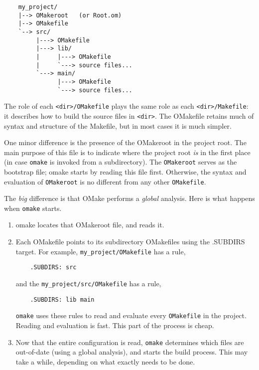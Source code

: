 \begin{verbatim}
    my_project/
    |--> OMakeroot   (or Root.om)
    |--> OMakefile
    `--> src/
         |---> OMakefile
         |---> lib/
         |     |---> OMakefile
         |     `---> source files...
         `---> main/
               |---> OMakefile
               `---> source files...
\end{verbatim}

The role of each \verb+<dir>/OMakefile+ plays the same role as each \verb+<dir>/Makefile+: it
describes how to build the source files in \verb+<dir>+.  The OMakefile retains much of syntax and
structure of the Makefile, but in most cases it is much simpler.

One minor difference is the presence of the OMakeroot in the project root.  The main purpose of this
file is to indicate where the project root \emph{is} in the first place (in case \verb+omake+ is
invoked from a subdirectory).  The \verb+OMakeroot+ serves as the bootstrap file; omake starts by
reading this file first.  Otherwise, the syntax and evaluation of \verb+OMakeroot+ is no different
from any other \verb+OMakefile+.

The \emph{big} difference is that OMake performs a \emph{global} analysis.  Here is what happens
when \verb+omake+ starts.

\begin{enumerate}
\item omake locates that OMakeroot file, and reads it.
\item Each OMakefile points to its subdirectory OMakefiles using the .SUBDIRS target.
For example, \verb+my_project/OMakefile+ has a rule,

\begin{verbatim}
    .SUBDIRS: src
\end{verbatim}

and the \verb+my_project/src/OMakefile+ has a rule,

\begin{verbatim}
    .SUBDIRS: lib main
\end{verbatim}

\verb+omake+ uses these rules to read and evaluate every \verb+OMakefile+ in the project.
Reading and evaluation is fast.  This part of the process is cheap.

\item Now that the entire configuration is read, \verb+omake+ determines which files are out-of-date
(using a global analysis), and starts the build process.  This may take a while, depending on what
exactly needs to be done.
\end{enumerate}

